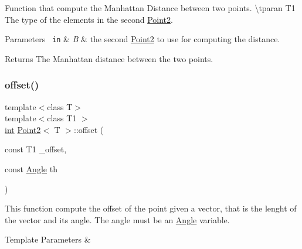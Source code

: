 Function that compute the Manhattan Distance between two points. \textbackslash{}tparan T1 The type of the elements in the second {\ttfamily \mbox{\hyperlink{class_point2}{Point2}}}. 


\begin{DoxyParams}[1]{Parameters}
\mbox{\texttt{ in}}  & {\em B} & the second {\ttfamily \mbox{\hyperlink{class_point2}{Point2}}} to use for computing the distance. \\
\hline
\end{DoxyParams}
\begin{DoxyReturn}{Returns}
The Manhattan distance between the two points. 
\end{DoxyReturn}
\mbox{\label{class_point2_af484708a23f679425d8434bc24387ab8}} 
\subsubsection{\texorpdfstring{offset()}{offset()}\hspace{0.1cm}{\footnotesize\ttfamily [1/3]}}
{\footnotesize\ttfamily template$<$class T$>$ \\
template$<$class T1 $>$ \\
\mbox{\hyperlink{draw_8hh_aa620a13339ac3a1177c86edc549fda9b}{int}} \mbox{\hyperlink{class_point2}{Point2}}$<$ T $>$\+::offset (\begin{DoxyParamCaption}\item[{const T1}]{\+\_\+offset,  }\item[{const \mbox{\hyperlink{class_angle}{Angle}}}]{th }\end{DoxyParamCaption})\hspace{0.3cm}{\ttfamily [inline]}}



This function compute the offset of the point given a vector, that is the lenght of the vector and its angle. The angle must be an {\ttfamily \mbox{\hyperlink{class_angle}{Angle}}} variable. 


\begin{DoxyTemplParams}{Template Parameters}
{\em } & \\
\hline
\end{DoxyTemplParams}
\mbox{\label{class_point2_a206d80b5b86b22039f7565dc2b8bdab1}} 
